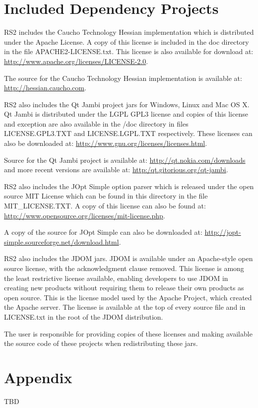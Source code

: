 \documentclass[12pt]{article}
\begin{document}
\section{Included Dependency Projects}
RS2 includes the Caucho Technology Hessian implementation which is distributed
under the Apache License. A copy of this license is included in the doc
directory in the file APACHE2-LICENSE.txt. This license is also available for
download at: \url{http://www.apache.org/licenses/LICENSE-2.0}. 

The source for the Caucho Technology Hessian implementation is available at:
\url{http://hessian.caucho.com}.

RS2 also includes the Qt Jambi project jars for Windows, Linux and Mac OS X.  Qt
Jambi is distributed under the LGPL GPL3 license and copies of this license and
exception are also available in the /doc directory in files LICENSE.GPL3.TXT and
LICENSE.LGPL.TXT respectively. These licenses can also be downloaded at:
\url{http://www.gnu.org/licenses/licenses.html}.
   
Source for the Qt Jambi project is available at:
\url{http://qt.nokia.com/downloads} and more recent versions are available at:
\url{http:/qt.gitorious.org/qt-jambi}.

RS2 also includes the JOpt Simple option parser which is released under
the open source MIT License which can be found in this directory in the file
MIT\_LICENSE.TXT.  A copy of this license can also be found at:
\url{http://www.opensource.org/licenses/mit-license.php}.
   
A copy of the source for JOpt Simple can also be downloaded at:
\url{http://jopt-simple.sourceforge.net/download.html}.

RS2 also includes the JDOM jars.  JDOM is available under an Apache-style open
source license, with the acknowledgment clause removed. This license is among
the least restrictive license available, enabling developers to use JDOM in
creating new products without requiring them to release their own products as
open source. This is the license model used by the Apache Project, which created
the Apache server. The license is available at the top of every source file and
in LICENSE.txt in the root of the JDOM distribution.                

The user is responsible for providing copies of these licenses and making
available the source code of these projects when redistributing these jars.

\section{Appendix}
TBD
\end{document}
